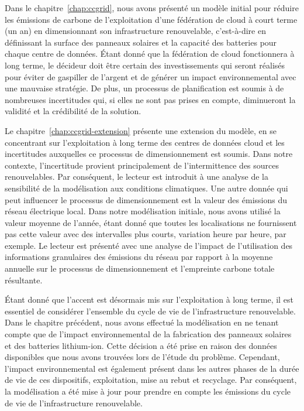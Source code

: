Dans le chapitre~\ref{chap:ccgrid}, nous avons présenté un modèle initial pour réduire les émissions de carbone de l'exploitation d'une fédération de cloud à court terme (un an) en dimensionnant son infrastructure renouvelable, c'est-à-dire en définissant la surface des panneaux solaires et la capacité des batteries pour chaque centre de données. Étant donné que la fédération de cloud fonctionnera à long terme, le décideur doit être certain des investissements qui seront réalisés pour éviter de gaspiller de l'argent et de générer un impact environnemental avec une mauvaise stratégie. De plus, un processus de planification est soumis à de nombreuses incertitudes qui, si elles ne sont pas prises en compte, diminueront la validité et la crédibilité de la solution.

Le chapitre~\ref{chap:ccgrid-extension} présente une extension du modèle, en se concentrant sur l'exploitation à long terme des centres de données cloud et les incertitudes auxquelles ce processus de dimensionnement est soumis. Dans notre contexte, l'incertitude provient principalement de l'intermittence des sources renouvelables. Par conséquent, le lecteur est introduit à une analyse de la sensibilité de la modélisation aux conditions climatiques. Une autre donnée qui peut influencer le processus de dimensionnement est la valeur des émissions du réseau électrique local. Dans notre modélisation initiale, nous avons utilisé la valeur moyenne de l'année, étant donné que toutes les localisations ne fournissent pas cette valeur avec des intervalles plus courts, variation heure par heure, par exemple. Le lecteur est présenté avec une analyse de l'impact de l'utilisation des informations granulaires des émissions du réseau par rapport à la moyenne annuelle sur le processus de dimensionnement et l'empreinte carbone totale résultante.


Étant donné que l'accent est désormais mis sur l'exploitation à long terme, il est essentiel de considérer l'ensemble du cycle de vie de l'infrastructure renouvelable. Dans le chapitre précédent, nous avons effectué la modélisation en ne tenant compte que de l'impact environnemental de la fabrication des panneaux solaires et des batteries lithium-ion. Cette décision a été prise en raison des données disponibles que nous avons trouvées lors de l'étude du problème. Cependant, l'impact environnemental est également présent dans les autres phases de la durée de vie de ces dispositifs, exploitation, mise au rebut et recyclage. Par conséquent, la modélisation a été mise à jour pour prendre en compte les émissions du cycle de vie de l'infrastructure renouvelable.


